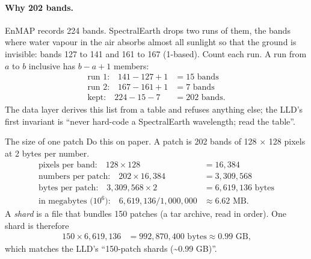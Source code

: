 \paragraph{Why 202 bands.} EnMAP records 224 bands. SpectralEarth drops two runs of them, the bands where water
vapour in the air absorbs almost all sunlight so that the ground is invisible: bands 127 to 141 and 161 to 167
(1-based).\tbrk{} Count each run. A run from $a$ to $b$ inclusive has $b - a + 1$
members:
\begin{align*}
  \text{run 1:}\quad 141 - 127 + 1 &= 15 \text{ bands}\\
  \text{run 2:}\quad 167 - 161 + 1 &= 7 \text{ bands}\\
  \text{kept:}\quad 224 - 15 - 7 &= 202 \text{ bands.}
\end{align*}
The data layer derives this list from a table and refuses anything else; the LLD's first invariant is
``never hard-code a SpectralEarth wavelength; read the table''.

\begin{worked}[label={we:pretrain:patchbytes}]{The size of one patch}
Do this on paper. A patch is 202 bands of 128 $\times$ 128 pixels at 2 bytes per number.
\begin{align*}
  \text{pixels per band:}\quad 128 \times 128 &= 16{,}384\\
  \text{numbers per patch:}\quad 202 \times 16{,}384 &= 3{,}309{,}568\\
  \text{bytes per patch:}\quad 3{,}309{,}568 \times 2 &= 6{,}619{,}136 \text{ bytes}\\
  \text{in megabytes (}10^6\text{):}\quad 6{,}619{,}136 / 1{,}000{,}000 &\approx 6.62 \text{ MB.}
\end{align*}
A \emph{shard} is a file that bundles 150 patches (a tar archive, read in order). One shard is therefore
\begin{align*}
  150 \times 6{,}619{,}136 &= 992{,}870{,}400 \text{ bytes} \approx 0.99 \text{ GB,}
\end{align*}
which matches the LLD's ``150-patch shards (\textasciitilde 0.99 GB)''.\tbrk{}
\end{worked}

